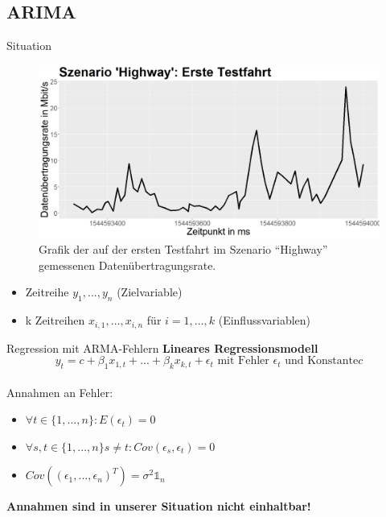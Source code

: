 \subsection{ARIMA}

\begin{frame}{Situation}
	\begin{figure}[]
		\includegraphics[scale=0.25]{highway_drive_one}
		\caption{Grafik der auf der ersten Testfahrt im Szenario ``Highway'' gemessenen Datenübertragungsrate.}
		\label{highway_drive_one}
	\end{figure}
	
	\begin{itemize}
		\item Zeitreihe $y_1,...,y_n$ (Zielvariable)
		\item k Zeitreihen $x_{i,1},...,x_{i,n}$ für $i=1,...,k$ (Einflussvariablen)
	\end{itemize}
\end{frame}

\begin{frame}{Regression mit ARMA-Fehlern}
	\textbf{Lineares Regressionsmodell} \\
	$$y_{t} = c + \beta_1 x_{1,t} + ... + \beta_k x_{k,t} + \epsilon_t \text{ mit Fehler } \epsilon_t \text{ und Konstante}c$$ \\
	Annahmen an Fehler:
	\begin{itemize}
		\item $\forall t \in \{1,...,n\}: E(\epsilon_t) = 0$
		\item $\forall s, t \in \{1,...,n\} s\neq t: Cov(\epsilon_s, \epsilon_t)=0 $
		\item $Cov((\epsilon_1,...,\epsilon_n)^T)=\sigma^2 \mathds{1}_n$
	\end{itemize}
	\textbf{Annahmen sind in unserer Situation nicht einhaltbar!}
\end{frame}

